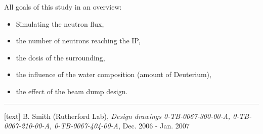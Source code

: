 {\begin{frame}
 \flukalogo
 All goals of this study in an overview:
\begin{itemize}
 \item Simulating the neutron flux,
 \item the number of neutrons reaching the IP,
 \item the dosis of the surrounding,
 \item the influence of the water composition (amount of Deuterium),
 \item the effect of the beam dump design.
\end{itemize}
\vspace*{0.6cm}
\rule{12cm}{.1pt}
\begin{thebibliography}{9}
[text]
 B. Smith (Rutherford Lab), \emph{Design drawings 0-TB-0067-300-00-A, 0-TB-0067-210-00-A, 0-TB-0067-404-00-A}, Dec. 2006 - Jan. 2007
\end{thebibliography}
\end{frame}
}

